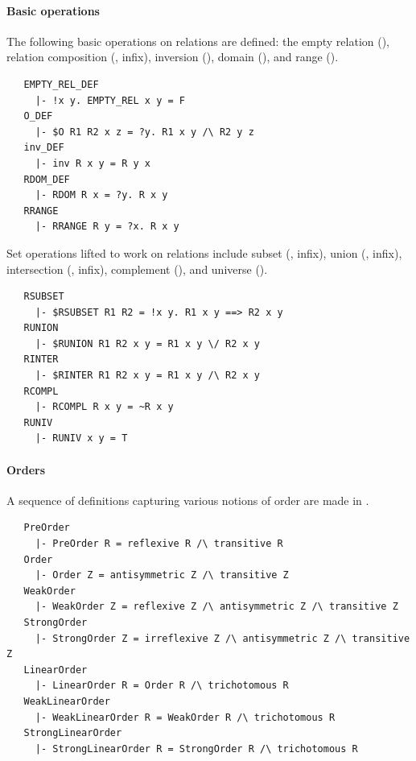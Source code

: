 \paragraph{Basic operations}

The following basic operations on relations are defined: the empty
relation (), relation composition (,
infix), inversion (), domain (), and range
().
%
\begin{hol}
\begin{verbatim}
   EMPTY_REL_DEF
     |- !x y. EMPTY_REL x y = F
   O_DEF
     |- $O R1 R2 x z = ?y. R1 x y /\ R2 y z
   inv_DEF
     |- inv R x y = R y x
   RDOM_DEF
     |- RDOM R x = ?y. R x y
   RRANGE
     |- RRANGE R y = ?x. R x y
\end{verbatim}
\end{hol}

Set operations lifted to work on relations include subset
(, infix), union (, infix),
intersection (, infix), complement (),
and universe ().
%
\begin{hol}
\begin{verbatim}
   RSUBSET
     |- $RSUBSET R1 R2 = !x y. R1 x y ==> R2 x y
   RUNION
     |- $RUNION R1 R2 x y = R1 x y \/ R2 x y
   RINTER
     |- $RINTER R1 R2 x y = R1 x y /\ R2 x y
   RCOMPL
     |- RCOMPL R x y = ~R x y
   RUNIV
     |- RUNIV x y = T
\end{verbatim}
\end{hol}

\paragraph {Orders}

A sequence of definitions capturing various notions of order are made
in .
%
\begin{hol}
\begin{verbatim}
   PreOrder
     |- PreOrder R = reflexive R /\ transitive R
   Order
     |- Order Z = antisymmetric Z /\ transitive Z
   WeakOrder
     |- WeakOrder Z = reflexive Z /\ antisymmetric Z /\ transitive Z
   StrongOrder
     |- StrongOrder Z = irreflexive Z /\ antisymmetric Z /\ transitive Z
   LinearOrder
     |- LinearOrder R = Order R /\ trichotomous R
   WeakLinearOrder
     |- WeakLinearOrder R = WeakOrder R /\ trichotomous R
   StrongLinearOrder
     |- StrongLinearOrder R = StrongOrder R /\ trichotomous R
\end{verbatim}
\end{hol}

